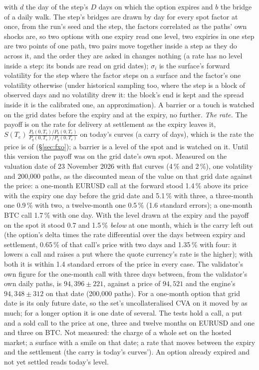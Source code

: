 \documentclass[11pt,a4paper]{article}
\begin{document}
with $d$ the day of the step's $D$ days on which the option expires and $b$ the bridge of a daily walk. The step's bridges are drawn by day for every spot factor at once, from the run's seed and the step, the factors correlated as the paths' own shocks are, so two options with one expiry read one level, two expiries in one step are two points of one path, two pairs move together inside a step as they do across it, and the order they are asked in changes nothing (a rate has no level inside a step: its bonds are read on grid dates); $\sigma_i$ is the surface's forward volatility for the step where the factor steps on a surface and the factor's one volatility otherwise (under historical sampling too, where the step is a block of observed days and no volatility drew it: the block's end is kept and the spread inside it is the calibrated one, an approximation). A barrier or a touch is watched on the grid dates before the expiry and at the expiry, no further. \emph{The rate.} The payoff is on the rate for delivery at settlement as the expiry leaves it, $S(T_e)\,\frac{P_b(0,T_s)/P_b(0,T_e)}{P_q(0,T_s)/P_q(0,T_e)}$ on today's curves (a carry of days), which is the rate the price is of (\S\ref{sec:fxo}); a barrier is a level of the spot and is watched on it. Until this version the payoff was on the grid date's own spot. Measured on the valuation date of 23 November 2026 with flat curves (4\,\% and 2\,\%), one volatility and 200,000 paths, as the discounted mean of the value on that grid date against the price: a one-month EURUSD call at the forward stood 1.4\,\% above its price with the expiry one day before the grid date and 5.1\,\% with three, a three-month one 0.9\,\% with two, a twelve-month one 0.5\,\% (1.6 standard errors); a one-month BTC call 1.7\,\% with one day. With the level drawn at the expiry and the payoff on the spot it stood 0.7 and 1.5\,\% \emph{below} at one month, which is the carry left out (the option's delta times the rate differential over the days between expiry and settlement, 0.65\,\% of that call's price with two days and 1.35\,\% with four: it lowers a call and raises a put where the quote currency's rate is the higher); with both it is within 1.4 standard errors of the price in every case. The validator's own figure for the one-month call with three days between, from the validator's own daily paths, is $94{,}396\pm221$, against a price of $94{,}521$ and the engine's $94{,}348\pm312$ on that date (200,000 paths). For a one-month option that grid date is its only future date, so the set's uncollateralised CVA on it moved by as much; for a longer option it is one date of several. The tests hold a call, a put and a sold call to the price at one, three and twelve months on EURUSD and one and three on BTC. Not measured: the charge of a whole set on the hosted market; a surface with a smile on that date; a rate that moves between the expiry and the settlement (the carry is today's curves'). An option already expired and not yet settled reads today's level.
\end{document}
